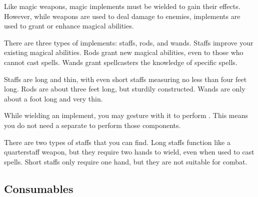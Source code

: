   \newpage
{}

  Like magic weapons, magic implements must be wielded to gain their effects.
  However, while weapons are used to deal damage to enemies, implements are used to grant or enhance magical abilities.

  There are three types of implements: staffs, rods, and wands.
  Staffs improve your existing magical abilities.
  Rods grant new magical abilities, even to those who cannot cast spells.
  Wands grant spellcasters the knowledge of specific spells.

  Staffs are long and thin, with even short staffs measuring no less than four feet long.
  Rods are about three feet long, but sturdily constructed.
  Wands are only about a foot long and very thin.

   While wielding an implement, you may gesture with it to perform .
  This means you do not need a separate  to perform those components.

  There are two types of staffs that you can find.
  Long staffs function like a quarterstaff weapon, but they require two hands to wield, even when used to cast spells.
  Short staffs only require one hand, but they are not suitable for combat.

  \begin{longcolumn}
    
  \end{longcolumn}

  

  \begin{longcolumn}
    \section{Consumables}\label{Consumables}

      
  \end{longcolumn}

  


